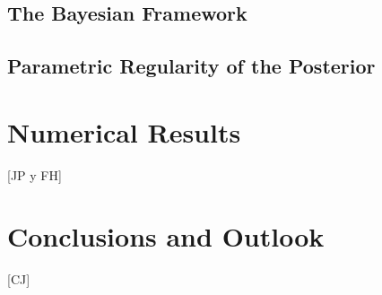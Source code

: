 \documentclass[10pt,reqno]{amsart}
\theoremstyle{remark}
\newcommand{\com}[1]{{{\color{red} [#1]}}}
\numberwithin{equation}{section}
\begin{document}
\subsection{The Bayesian Framework}
\label{ssec:bayesian_frame}

\subsection{Parametric Regularity of the Posterior}
\label{ssec:parametric_posterior}


\section{Numerical Results}
\label{sec:intro}
\com{JP y FH}


\section{Conclusions and Outlook}
\label{sec:intro}

\com{CJ}
\end{document}
